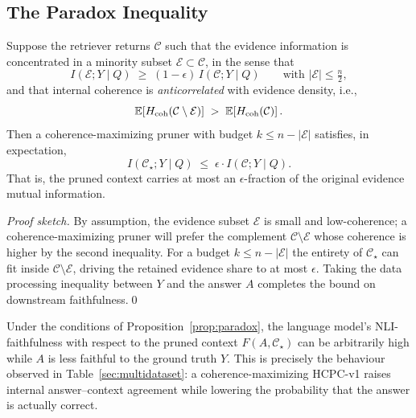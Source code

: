 \subsection{The Paradox Inequality}

\begin{proposition}
\label{prop:paradox}
Suppose the retriever returns $\mathcal{C}$ such that the evidence
information is concentrated in a minority subset
$\mathcal{E} \subset \mathcal{C}$, in the sense that
\[
  I(\mathcal{E}; Y \mid Q)
  \;\geq\;
  (1 - \epsilon)\, I(\mathcal{C}; Y \mid Q)
  \qquad
  \text{with } |\mathcal{E}| \leq \tfrac{n}{2},
\]
and that internal coherence is \emph{anticorrelated} with evidence density,
i.e.,
\[
  \mathbb{E}\!\left[
    H_{\textup{coh}}(\mathcal{C} \setminus \mathcal{E})
  \right]
  \;>\;
  \mathbb{E}\!\left[
    H_{\textup{coh}}(\mathcal{C})
  \right].
\]
Then a coherence-maximizing pruner with budget $k \leq n - |\mathcal{E}|$
satisfies, in expectation,
\[
  I(\mathcal{C}_\star; Y \mid Q)
  \;\leq\;
  \epsilon \cdot I(\mathcal{C}; Y \mid Q).
\]
That is, the pruned context carries at most an $\epsilon$-fraction of the
original evidence mutual information.
\end{proposition}

\begin{proof}[Proof sketch]
By assumption, the evidence subset $\mathcal{E}$ is small and
low-coherence; a coherence-maximizing pruner will prefer the complement
$\mathcal{C} \setminus \mathcal{E}$ whose coherence is higher by the second
inequality.  For a budget $k \leq n - |\mathcal{E}|$ the entirety of
$\mathcal{C}_\star$ can fit inside $\mathcal{C} \setminus \mathcal{E}$,
driving the retained evidence share to at most $\epsilon$.  Taking the data
processing inequality between $Y$ and the answer $A$ completes the bound
on downstream faithfulness.\qed
\end{proof}

\begin{corollary}
\label{cor:paradox}
Under the conditions of Proposition~\ref{prop:paradox}, the language model's
NLI-faithfulness with respect to the pruned context
$F(A, \mathcal{C}_\star)$ can be arbitrarily high while $A$ is less
faithful to the ground truth $Y$.  This is precisely the behaviour
observed in Table~\ref{sec:multidataset}: a coherence-maximizing HCPC-v1
raises internal answer--context agreement while lowering the probability
that the answer is actually correct.
\end{corollary}

